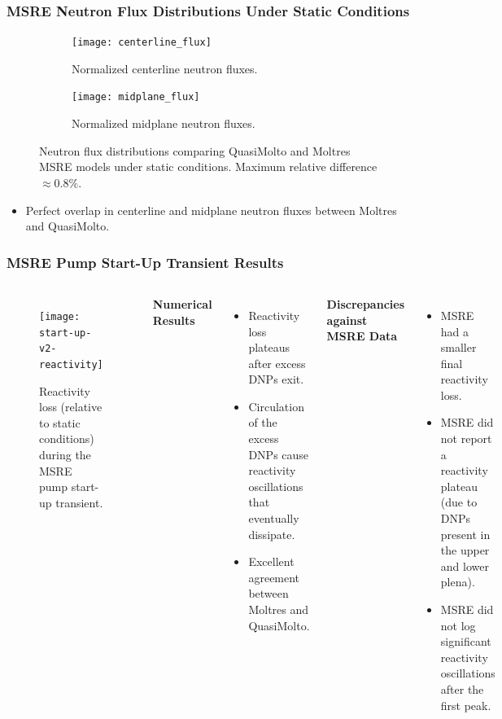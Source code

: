 \begin{frame}
  \frametitle{MSRE Neutron Flux Distributions Under Static Conditions}
  \begin{figure}[h]
    \centering
    \begin{subfigure}[b]{0.48\columnwidth}
      \centering
      \texttt{[image: centerline\_flux]}
      \caption{Normalized centerline neutron fluxes.}
      \label{fig:centerline-flux-dist}
    \end{subfigure}
    \hfill
    \begin{subfigure}[b]{0.48\columnwidth}
      \centering
      \texttt{[image: midplane\_flux]}
      \caption{Normalized midplane neutron fluxes.}
      \label{fig:midplane-flux-dist}
    \end{subfigure}
    \caption{Neutron flux distributions comparing QuasiMolto and Moltres
    \gls{MSRE} models under static conditions. Maximum relative difference $\approx 0.8 \%$.}
    \label{fig:centerline-flux}
  \end{figure}
  \begin{itemize}
    \item Perfect overlap in centerline and midplane neutron fluxes between Moltres and QuasiMolto.
  \end{itemize}
\end{frame}

\begin{frame}
  \frametitle{MSRE Pump Start-Up Transient Results}
  \begin{columns}
  \column{5.5cm}
  \begin{figure}[t]
    \centering
    \texttt{[image: start-up-v2-reactivity]}
    \caption{Reactivity loss (relative to static conditions) during the \gls{MSRE} pump
    start-up transient.}
    \label{fig:start-up-reactivity}
  \end{figure}
  \column{5.5cm}
  \textbf{Numerical Results}
  \begin{itemize}
    \item Reactivity loss plateaus after excess DNPs exit.
    \item Circulation of the excess DNPs cause reactivity oscillations that eventually dissipate.
    \item Excellent agreement between Moltres and QuasiMolto.
  \end{itemize}
  \pause
  \textbf{Discrepancies against MSRE Data}
  \begin{itemize}
    \item MSRE had a smaller final reactivity loss.
    \item MSRE did not report a reactivity plateau (due to DNPs present in the upper and lower plena).
    \item MSRE did not log significant reactivity oscillations after the first peak.
  \end{itemize}
  \end{columns}
\end{frame}

